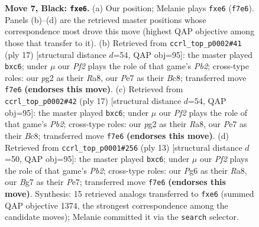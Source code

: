 \documentclass[11pt]{article}
\begin{document}
\begin{figure}[p]
\caption{\textbf{Move 7, Black: \texttt{fxe6}.} (a) Our position; Melanie plays \texttt{fxe6} (\texttt{f7e6}). Panels (b)--(d) are the retrieved master positions whose correspondence most drove this move (highest QAP objective among those that transfer to it). (b) Retrieved from \texttt{ccrl\_top\_p0002\#41} (ply 17) [structural distance $d$=54, QAP obj=95]: the master played \texttt{bxc6}; under $\mu$ our \emph{Pf2} plays the role of that game's \emph{Pb2}; cross-type roles: our \emph{p}g2 as their \emph{R}a8, our \emph{P}e7 as their \emph{B}c8; transferred move \texttt{f7e6} \textbf{(endorses this move)}. (c) Retrieved from \texttt{ccrl\_top\_p0002\#42} (ply 17) [structural distance $d$=54, QAP obj=95]: the master played \texttt{bxc6}; under $\mu$ our \emph{Pf2} plays the role of that game's \emph{Pb2}; cross-type roles: our \emph{p}g2 as their \emph{R}a8, our \emph{P}e7 as their \emph{B}c8; transferred move \texttt{f7e6} \textbf{(endorses this move)}. (d) Retrieved from \texttt{ccrl\_top\_p0001\#256} (ply 13) [structural distance $d$=50, QAP obj=95]: the master played \texttt{bxc6}; under $\mu$ our \emph{Pf2} plays the role of that game's \emph{Pb2}; cross-type roles: our \emph{P}g6 as their \emph{R}a8, our \emph{B}g7 as their \emph{P}e7; transferred move \texttt{f7e6} \textbf{(endorses this move)}. Synthesis: 15 retrieved analogs transferred to \texttt{fxe6} (summed QAP objective 1374, the strongest correspondence among the candidate moves); Melanie committed it via the \texttt{search} selector.}
\label{fig:thought-m13}
\end{figure}

\clearpage
\end{document}
